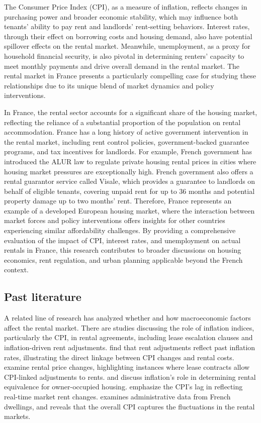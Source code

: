 \documentclass[12pt, times]{article}
\begin{document}
The Consumer Price Index (CPI), as a measure of inflation, reflects changes in purchasing power and broader economic stability, which may influence both tenants' ability to pay rent and landlords' rent-setting behaviors. Interest rates, through their effect on borrowing costs and housing demand, also have potential spillover effects on the rental market. Meanwhile, unemployment, as a proxy for household financial security, is also pivotal in determining renters' capacity to meet monthly payments and drive overall demand in the rental market. The rental market in France presents a particularly compelling case for studying these relationships due to its unique blend of market dynamics and policy interventions.

In France, the rental sector accounts for a significant share of the housing market, reflecting the reliance of a substantial proportion of the population on rental accommodation. France has a long history of active government intervention in the rental market, including rent control policies, government-backed guarantee programs, and tax incentives for landlords. For example, French government has introduced the ALUR law to regulate private housing rental prices in cities where housing market pressures are exceptionally high. French government also offers a rental guarantor service called Visale, which provides a guarantee to landlords on behalf of eligible tenants, covering unpaid rent for up to 36 months and potential property damage up to two months' rent. Therefore, France represents an example of a developed European housing market, where the interaction between market forces and policy interventions offers insights for other countries experiencing similar affordability challenges. By providing a comprehensive evaluation of the impact of CPI, interest rates, and unemployment on actual rentals in France, this research contributes to broader discussions on housing economics, rent regulation, and urban planning applicable beyond the French context.
\vspace{-1.0em}
\subsection{Past literature}
A related line of research has analyzed whether and how macroeconomic factors affect the rental market. There are studies discussing the role of inflation indices, particularly the CPI, in rental agreements, including lease escalation clauses and inflation-driven rent adjustments. \cite{dougherty1982inflation} find that rent adjustments reflect past inflation rates, illustrating the direct linkage between CPI changes and rental costs. \cite{crone2004cpi} examine rental price changes, highlighting instances where lease contracts allow CPI-linked adjustments to rents. \cite{arevalo2004rental} and \cite{eiglsperger2024owner} discuss inflation's role in determining rental equivalence for owner-occupied housing. \cite{ambrose2018housing} emphasize the CPI’s lag in reflecting real-time market rent changes. \cite{levy2021housing} examines administrative data from French dwellings, and reveals that the overall CPI captures the fluctuations in the rental markets.
\end{document}
